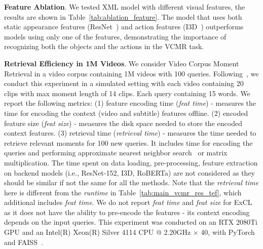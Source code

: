\documentclass[runningheads]{llncs}
\newcommand{\ra}[1]{\renewcommand{\arraystretch}{#1}}
\begin{document}
\begin{table}[!t]
\setlength{\tabcolsep}{0.3em}
\ra{1.}
\centering
\small
\caption{Feature ablation on TVR \textit{val} set, VCMR task. All  models use both videos and subtitles}
\label{tab:ablation_feature}
\end{table}


\kern2mm
\noindent\textbf{Feature Ablation}. We tested XML model with different visual features, the results are shown in Table~\ref{tab:ablation_feature}. 
The model that uses both static appearance features (ResNet~\cite{he2016deep}) and action features (I3D~\cite{carreira2017quo}) outperforms models using only one of the features, demonstrating the importance of recognizing both the objects and the actions in the VCMR task. 


\kern2mm
\noindent\textbf{Retrieval Efficiency in 1M Videos}. We consider Video Corpus Moment Retrieval in a video corpus containing 1M videos with 100 queries. Following~\cite{escorcia2019temporal}, we conduct this experiment in a simulated setting with each video containing 20 clips with max moment length of 14 clips. Each query containing 15 words. We report the following metrics: (1) feature encoding time (\textit{feat time}) - measures the time for encoding the context (video and subtitle) features offline. (2) encoded feature size (\textit{feat size}) - measures the disk space needed to store the encoded context features. (3) retrieval time (\textit{retrieval time}) - measures the time needed to retrieve relevant moments for 100 new queries. It includes time for encoding the queries and performing approximate nearest neighbor search~\cite{JDH17} or matrix multiplication. The time spent on data loading, pre-processing, feature extraction on backend models (i.e., ResNet-152, I3D, RoBERTa) are not considered as they should be similar if not the same for all the methods. Note that the \textit{retrieval time} here is different from the \textit{runtime} in Table~\ref{tab:main_vcmr_res_tef}, which additional includes \textit{feat time}. We do not report \textit{feat time} and \textit{feat size} for ExCL~\cite{ghosh2019excl} as it does not have the ability to pre-encode the features - its context encoding depends on the input queries. This experiment was conducted on an RTX 2080Ti GPU and an Intel(R) Xeon(R) Silver 4114 CPU @ 2.20GHz $\times$ 40, with PyTorch~\cite{paszke2017automatic} and FAISS~\cite{JDH17}.
\end{document}

